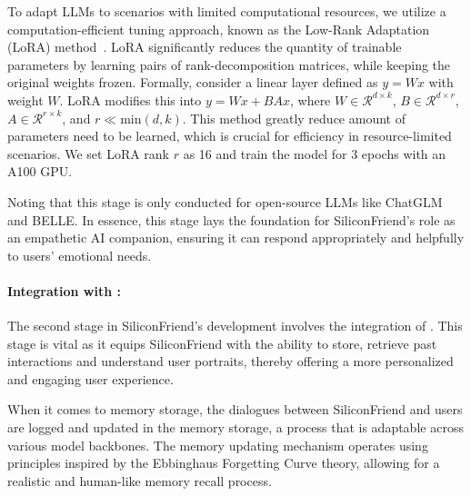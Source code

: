 To adapt LLMs to scenarios with limited computational resources, we utilize a computation-efficient tuning approach, known as the Low-Rank Adaptation (LoRA) method~\citep{hu2021lora}. LoRA significantly reduces the quantity of trainable parameters by learning pairs of rank-decomposition matrices, while keeping the original weights frozen.
Formally, consider a linear layer defined as $y = Wx$ with weight $W$. LoRA modifies this into $y = Wx + BAx$, where $W \in \mathcal{R}^{d\times k}$, $B \in \mathcal{R}^{d\times r}$, $A \in \mathcal{R}^{r\times k}$, and $r \ll \text{min}(d, k)$. This method greatly reduce amount of parameters need to be learned, which is crucial for efficiency in resource-limited scenarios. We set LoRA rank $r$ as 16 and train the model for 3 epochs with an A100 GPU. 

Noting that this stage is only conducted for open-source LLMs like ChatGLM and BELLE.
In essence, this stage lays the foundation for SiliconFriend's role as an empathetic AI companion, ensuring it can respond appropriately and helpfully to users' emotional needs.

\paragraph{Integration with \method:}
The second stage in SiliconFriend's development involves the integration of \method. This stage is vital as it equips SiliconFriend with the ability to store, retrieve past interactions and understand user portraits, thereby offering a more personalized and engaging user experience.

When it comes to memory storage, the dialogues between SiliconFriend and users are logged and updated in the memory storage, a process that is adaptable across various model backbones. 
The memory updating mechanism operates using principles inspired by the Ebbinghaus Forgetting Curve theory, allowing for a realistic and human-like memory recall process. 

